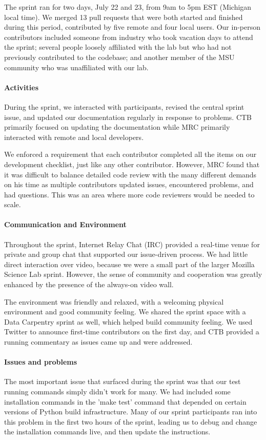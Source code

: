 \documentclass[11pt]{article}
\begin{document}
The sprint ran for two days, July 22 and 23, from 9am to 5pm EST
(Michigan local time).  We merged 13 pull requests that were both
started and finished during this period, contributed by five remote
and four local users.  Our in-person contributors included someone
from industry who took vacation days to attend the sprint; several
people loosely affiliated with the lab but who had not previously
contributed to the codebase; and another member of the MSU community
who was unaffiliated with our lab.

\paragraph{Activities}
During the sprint, we interacted with participants, revised the
central sprint issue, and updated our documentation regularly in
response to problems.  CTB primarily focused on updating the
documentation while MRC primarily interacted with remote and local
developers.

We enforced a requirement that each contributor completed all the
items on our development checklist, just like any other contributor.
However, MRC found that it was difficult to balance detailed code
review with the many different demands on his time as multiple
contributors updated issues, encountered problems, and had questions.
This was an area where more code reviewers would be needed to scale.

\paragraph{Communication and Environment} Throughout the sprint, Internet Relay Chat (IRC) provided a real-time
venue for private and group chat that supported our issue-driven
process.  We had little direct interaction over video, because we were
a small part of the larger Mozilla Science Lab sprint.  However, the
sense of community and cooperation was greatly enhanced by the
presence of the always-on video wall.

The environment was friendly and relaxed, with a welcoming physical
environment and good community feeling.  We shared the sprint space
with a Data Carpentry sprint as well, which helped build community feeling.
We used Twitter to announce first-time contributors on the first day, and
CTB provided a running commentary as issues came up and were addressed.

\paragraph{Issues and problems}
The most important issue that surfaced during the sprint was that our
test running commands simply didn't work for many.  We had included
some installation commands in the 'make test' command that depended on
certain versions of Python build infrastructure.  Many of our sprint
participants ran into this problem in the first two hours of the
sprint, leading us to debug and change the installation commands live,
and then update the instructions.
\end{document}
